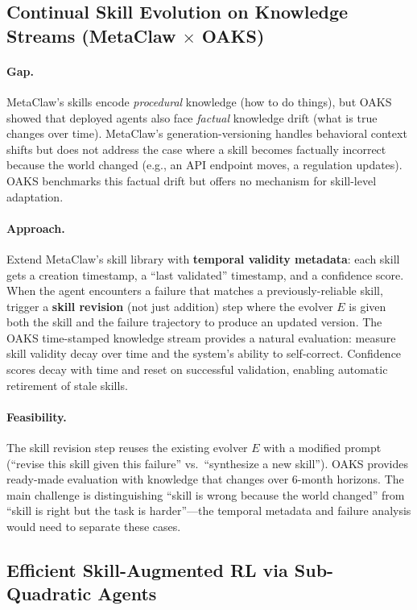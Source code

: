 \documentclass[11pt]{article}
\begin{document}
\subsection{Continual Skill Evolution on Knowledge Streams (MetaClaw $\times$ OAKS)}

\paragraph{Gap.}
MetaClaw's skills encode \emph{procedural} knowledge (how to do things), but OAKS~\cite{oaks} showed that deployed agents also face \emph{factual} knowledge drift (what is true changes over time).
MetaClaw's generation-versioning handles behavioral context shifts but does not address the case where a skill becomes factually incorrect because the world changed (e.g., an API endpoint moves, a regulation updates).
OAKS benchmarks this factual drift but offers no mechanism for skill-level adaptation.

\paragraph{Approach.}
Extend MetaClaw's skill library with \textbf{temporal validity metadata}: each skill gets a creation timestamp, a ``last validated'' timestamp, and a confidence score.
When the agent encounters a failure that matches a previously-reliable skill, trigger a \textbf{skill revision} (not just addition) step where the evolver $E$ is given both the skill and the failure trajectory to produce an updated version.
The OAKS time-stamped knowledge stream provides a natural evaluation: measure skill validity decay over time and the system's ability to self-correct.
Confidence scores decay with time and reset on successful validation, enabling automatic retirement of stale skills.

\paragraph{Feasibility.}
The skill revision step reuses the existing evolver $E$ with a modified prompt (``revise this skill given this failure'' vs.\ ``synthesize a new skill'').
OAKS provides ready-made evaluation with knowledge that changes over 6-month horizons.
The main challenge is distinguishing ``skill is wrong because the world changed'' from ``skill is right but the task is harder''---the temporal metadata and failure analysis would need to separate these cases.

\subsection{Efficient Skill-Augmented RL via Sub-Quadratic Agents}
\end{document}
